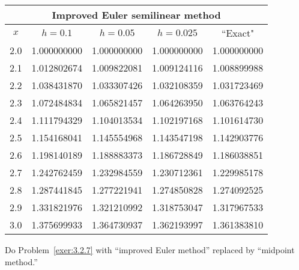 \documentclass{ximera}
\begin{document}
\begin{problem}
\begin{solution}
{\small
\begin{tabular}{|c|r|r|r|r|}
\hline
\multicolumn{5}{|c|}{Improved
 Euler semilinear method}\\\hline
\multicolumn{1}{|c|}{$x$}&
\multicolumn{1}{|c|}{$h=0.1$}&
\multicolumn{1}{|c|}{$h=0.05$}&
\multicolumn{1}{|c|}{$h=0.025$}&
\multicolumn{1}{|c|}{``Exact"}\\ \hline
2.0 & 1.000000000 & 1.000000000 & 1.000000000 & 1.000000000 \\
2.1 & 1.012802674 & 1.009822081 & 1.009124116 & 1.008899988 \\
2.2 & 1.038431870 & 1.033307426 & 1.032108359 & 1.031723469 \\
2.3 & 1.072484834 & 1.065821457 & 1.064263950 & 1.063764243 \\
2.4 & 1.111794329 & 1.104013534 & 1.102197168 & 1.101614730 \\
2.5 & 1.154168041 & 1.145554968 & 1.143547198 & 1.142903776 \\
2.6 & 1.198140189 & 1.188883373 & 1.186728849 & 1.186038851 \\
2.7 & 1.242762459 & 1.232984559 & 1.230712361 & 1.229985178 \\
2.8 & 1.287441845 & 1.277221941 & 1.274850828 & 1.274092525 \\
2.9 & 1.331821976 & 1.321210992 & 1.318753047 & 1.317967533 \\
3.0 & 1.375699933 & 1.364730937 & 1.362193997 & 1.361383810 \\
\hline
\end{tabular}}
 \end{solution}
 \end{problem}

\begin{problem}\label{exer:3.2.23}
Do Problem~\ref{exer:3.2.7} with ``improved Euler method''
replaced by ``midpoint method.''
\end{problem}
\end{document}
